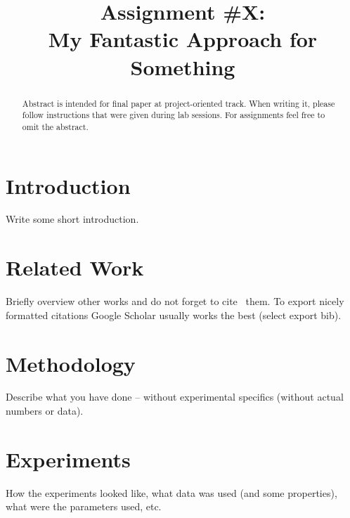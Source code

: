 \documentclass[conference]{IEEEtran}
\begin{document}
\title{Assignment \#X:\\My Fantastic Approach for Something}

\author{


}

\maketitle

\begin{abstract}
Abstract is intended for final paper at project-oriented track. When writing it, please follow instructions that were given during lab sessions. For assignments feel free to omit the abstract.
\end{abstract}

\section{Introduction}
Write some short introduction.

\section{Related Work}
Briefly overview other works and do not forget to cite~\cite{someexample2019} them. To export nicely formatted citations Google Scholar usually works the best (select export bib).

\section{Methodology}
Describe what you have done -- without experimental specifics (without actual numbers or data).

\section{Experiments}
How the experiments looked like, what data was used (and some properties), what were the parameters used, etc.
\end{document}

